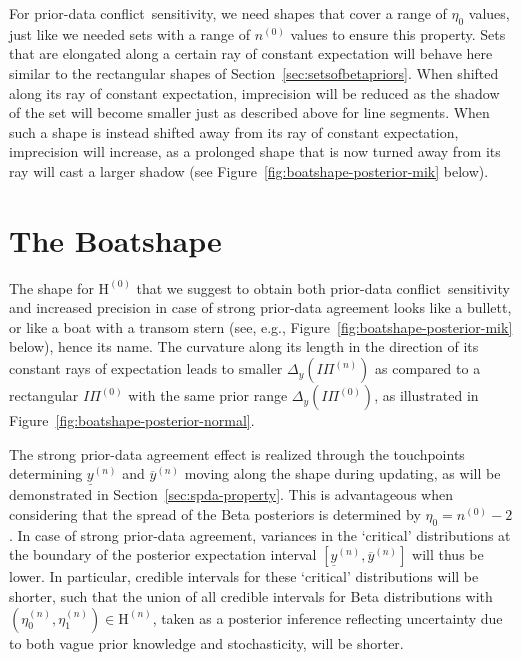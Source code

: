 \documentclass[runningheads,a4paper]{llncs}
\def\pdc{prior-data conflict}
\newcommand{\uz}{^{(0)}} %
\newcommand{\un}{^{(n)}} %
\newcommand{\ul}[1]{\underline{#1}}
\newcommand{\ol}[1]{\overline{#1}}
\def\ynl{\ul{y}\un}
\def\ynu{\ol{y}\un}
\def\nz{n\uz}
\def\PZ{I\!\!\Pi\uz}
\def\PN{I\!\!\Pi\un}
\def\EZ{\mathrm{H}\uz}
\def\EN{\mathrm{H}\un}
\def\ezn{\eta_0\un}
\def\eon{\eta_1\un}
\begin{document}
For \pdc\ sensitivity, we need shapes that cover a range of $\eta_0$ values,
just like we needed sets with a range of $\nz$ values to ensure this property.
Sets that are elongated along a certain ray of constant expectation
will behave here similar to the rectangular shapes of Section~\ref{sec:setsofbetapriors}.
When shifted along its ray of constant expectation,
imprecision will be reduced as the shadow of the set will become smaller just as described above for line segments.
When such a shape is instead shifted away from its ray of constant expectation,
imprecision will increase, as a prolonged shape that is now turned away from its ray 
will cast a larger shadow (see Figure~\ref{fig:boatshape-posterior-mik} below).%


\section{The Boatshape}
\label{sec:boatshape}

The shape for $\EZ$ that we suggest to obtain both \pdc\ sensitivity and increased precision
in case of strong prior-data agreement looks like a bullett, or like a boat with a transom stern
(see, e.g., Figure~\ref{fig:boatshape-posterior-mik} below), hence its name.
The curvature along its length in the direction of its constant rays of expectation
leads to smaller $\Delta_y(\PN)$ as compared to a rectangular $\PZ$ with the same prior range $\Delta_y(\PZ)$,
as illustrated in Figure~\ref{fig:boatshape-posterior-normal}.

The strong prior-data agreement effect is realized
through the touchpoints determining $\ynl$ and $\ynu$
moving along the shape during updating,
as will be demonstrated in Section~\ref{sec:spda-property}.
This is advantageous when considering that the spread of the Beta posteriors is determined by $\eta_0 = \nz - 2$.
In case of strong prior-data agreement, variances in the `critical' distributions
at the boundary of the posterior expectation interval $[\ynl,\ynu]$ will thus be lower.
In particular, credible intervals for these `critical' distributions will be shorter, 
such that the union of all credible intervals for Beta distributions with $(\ezn, \eon) \in \EN$,
taken as a posterior inference reflecting uncertainty due to both vague prior knowledge and stochasticity, will be shorter.
\end{document}
